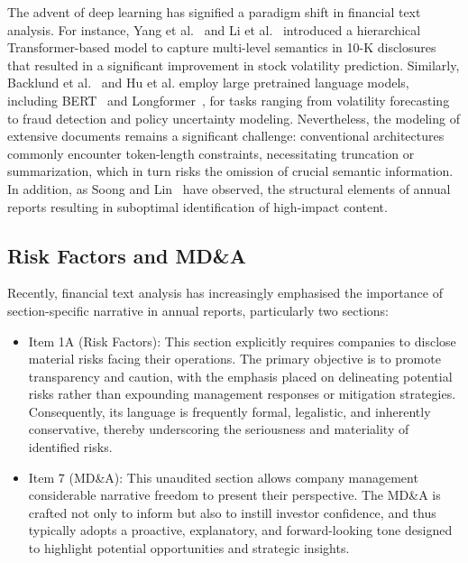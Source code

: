 \documentclass[sigconf]{acmart}
\begin{document}
The advent of deep learning has signified a paradigm shift in financial text analysis. 
For instance, Yang et al.~\cite{yang2020html} and Li et al.~\cite{li2024nlp} introduced a hierarchical Transformer-based model to capture multi-level semantics in 10-K disclosures that resulted in a significant improvement in stock volatility prediction.
Similarly, Backlund et al.~\cite{backlund2023detection} and Hu et al. \cite{hu2024zipzap} employ large pretrained language models, including BERT~\cite{devlin2019bert} and Longformer~\cite{beltagy2020longformer}, for tasks ranging from volatility forecasting to fraud detection and policy uncertainty modeling. 
Nevertheless, the modeling of extensive documents remains a significant challenge: conventional architectures commonly encounter token-length constraints, necessitating truncation or summarization, which in turn risks the omission of crucial semantic information. 
In addition, as Soong and Lin~\cite{soong2021sentiment} have observed, the structural elements of annual reports resulting in suboptimal identification of high-impact content.


\subsection{Risk Factors and MD\&A}

Recently, financial text analysis has increasingly emphasised the importance of section-specific narrative in annual reports, particularly two sections:

\begin{itemize}
    \item Item 1A (Risk Factors): This section explicitly requires companies to disclose material risks facing their operations. The primary objective is to promote transparency and caution, with the emphasis placed on delineating potential risks rather than expounding management responses or mitigation strategies. Consequently, its language is frequently formal, legalistic, and inherently conservative, thereby underscoring the seriousness and materiality of identified risks.
    \item Item 7 (MD\&A): This unaudited section allows company management considerable narrative freedom to present their perspective.  The MD\&A is crafted not only to inform but also to instill investor confidence, and thus typically adopts a proactive, explanatory, and forward-looking tone designed to highlight potential opportunities and strategic insights.
\end{itemize}
\end{document}
